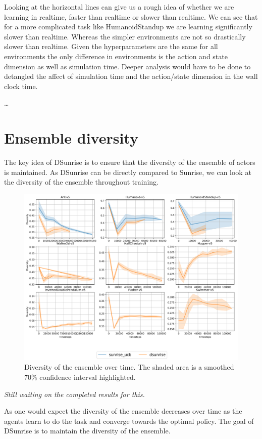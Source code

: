 Looking at the horizontal lines can give us a rough idea of whether we are learning in realtime, faster than realtime or slower than realtime. We can see that for a more complicated task like HumanoidStandup we are learning significantly slower than realtime. Whereas the simpler environments are not so drastically slower than realtime. Given the hyperparameters are the same for all environments the only difference in environments is the action and state dimension as well as simulation time. Deeper analysis would have to be done to detangled the affect of simulation time and the action/state dimension in the wall clock time.

\dots

\section{Ensemble diversity}
The key idea of DSunrise is to ensure that the diversity of the ensemble of actors is maintained. As DSunrise can be directly compared to Sunrise, we can look at the diversity of the ensemble throughout training.

\begin{figure}
    \centering
    \includegraphics[width=1\textwidth]{figures/diversity_results.png}
    \caption{Diversity of the ensemble over time. The shaded area is a smoothed 70\% confidence interval highlighted.}
    \label{fig:diversity}
\end{figure}

\textit{Still waiting on the completed results for this.}

As one would expect the diversity of the ensemble decreases over time as the agents learn to do the task and converge towards the optimal policy. The goal of DSunrise is to maintain the diversity of the ensemble.